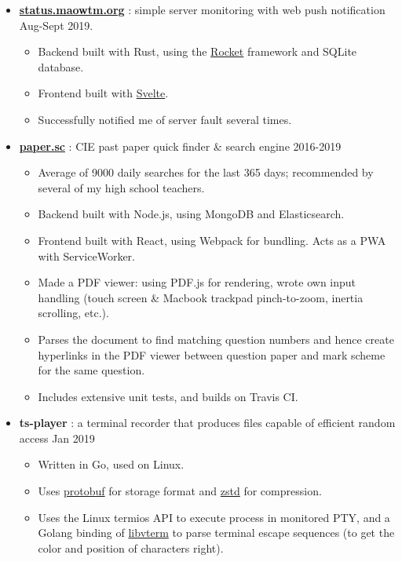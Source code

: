  \begin{itemize}

    \item \href{https://status.maowtm.org}{\color{link}\textbf{status.maowtm.org}} : simple server monitoring with web push notification \dashdiv{} Aug-Sept 2019.

    \begin{itemize}
      \item Backend built with Rust, using the \href{https://rocket.rs}{\color{link}Rocket} framework and SQLite database.
      \item Frontend built with \href{https://svelte.dev/}{\color{link}Svelte}.
      \item Successfully notified me of server fault several times.
    \end{itemize}

    \item \href{https://paper.sc}{\color{link}\textbf{paper.sc}} : CIE past paper quick finder \& search engine \dashdiv{} 2016-2019

    \begin{itemize}
      \item Average of \texttildelow{}9000 daily searches for the last 365 days; recommended by several of my high school teachers.
      \item Backend built with Node.js, using MongoDB and Elasticsearch.
      \item Frontend built with React, using Webpack for bundling. Acts as a PWA with ServiceWorker.
      \item Made a PDF viewer: using PDF.js for rendering, wrote own input handling (touch screen \& Macbook trackpad pinch-to-zoom, inertia scrolling, etc.).
      \item Parses the document to find matching question numbers and hence create hyperlinks in the PDF viewer between question paper and mark scheme for the same question.
      \item Includes extensive unit tests, and builds on Travis CI.
    \end{itemize}

    \item \textbf{ts-player} : a terminal recorder that produces files capable of efficient random access \dashdiv{} Jan 2019

    \begin{itemize}
      \item Written in Go, used on Linux.
      \item Uses \href{https://developers.google.com/protocol-buffers}{\color{link}protobuf} for storage format and \href{https://facebook.github.io/zstd/}{\color{link}zstd} for compression.
      \item Uses the Linux termios API to execute process in monitored PTY, and a Golang binding of \href{http://www.leonerd.org.uk/code/libvterm/}{\color{link}libvterm} to parse terminal escape sequences (to get the color and position of characters right).
    \end{itemize}


\end{itemize}
